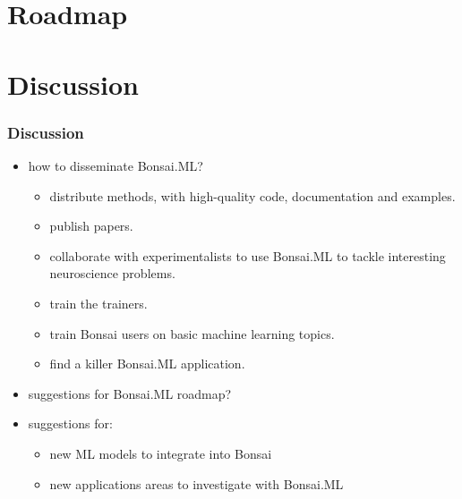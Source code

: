 \documentclass{beamer}
\begin{document}
\section{Roadmap}

\section{Discussion}

\begin{frame}
    \frametitle{Discussion}

    \begin{itemize}

        \item how to disseminate Bonsai.ML?
            \begin{itemize}

                \item distribute methods, with high-quality code,
                    documentation and examples.

                \item publish papers.

                \item collaborate with experimentalists to use Bonsai.ML
                    to tackle interesting neuroscience problems.

                \item train the trainers.

                \item train Bonsai users on basic machine learning topics.

                \item find a killer Bonsai.ML application.

            \end{itemize}

        \item suggestions for Bonsai.ML roadmap?

        \item suggestions for:

            \begin{itemize}
                \item new ML models to integrate into Bonsai
                \item new applications areas to investigate with Bonsai.ML

                    \begin{itemize}


\end{itemize}
\end{itemize}
\end{itemize}
\end{frame}
\end{document}
